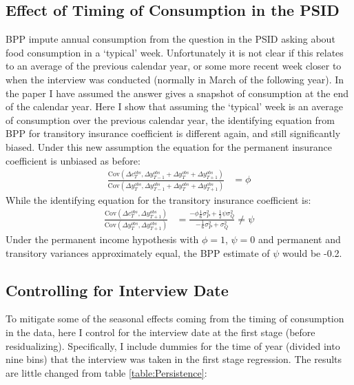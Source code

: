 \subsection{Effect of Timing of Consumption in the PSID} \label{typical_week}
BPP impute annual consumption from the question in the PSID asking about food consumption in a `typical' week. Unfortunately it is not clear if this relates to an average of the previous calendar year, or some more recent week closer to when the interview was conducted (normally in March of the following year). In the paper I have assumed the answer gives a snapshot of consumption at the end of the calendar year. Here I show that assuming the `typical' week is an average of consumption over the previous calendar year, the identifying equation from BPP for transitory insurance coefficient is different again, and still significantly biased. Under this new assumption the equation for the permanent insurance coefficient is unbiased as before:
\begin{align*}
\frac{\mathrm{Cov}(\Delta c^{obs}_{T}, \Delta y^{obs}_{T-1}+\Delta y^{obs}_{T}+\Delta y^{obs}_{T+1})}{\mathrm{Cov}(\Delta y^{obs}_{T}, \Delta y^{obs}_{T-1}+\Delta y^{obs}_{T}+\Delta y^{obs}_{T+1})}&= \phi
\end{align*}
While the identifying equation for the transitory insurance coefficient is:
\begin{align*}
\frac{\mathrm{Cov}(\Delta c^{obs}_{T},\Delta y^{obs}_{T+1})}{\mathrm{Cov}(\Delta y^{obs}_{T},\Delta y^{obs}_{T+1})} &= \frac{-\phi\frac{1}{6}\sigma^2_P + \frac{1}{2}\psi\sigma^2_Q}{-\frac{1}{6}\sigma^2_P + \sigma^2_Q} \neq \psi 
\end{align*}
Under the permanent income hypothesis with $\phi=1$, $\psi=0$ and permanent and transitory variances approximately equal, the BPP estimate of $\psi$ would be -0.2.

\subsection{Controlling for Interview Date} \label{interview_date}
To mitigate some of the seasonal effects coming from the timing of consumption in the data, here I control for the interview date at the first stage (before residualizing). Specifically, I include dummies for the time of year (divided into nine bins) that the interview was taken in the first stage regression. The results are little changed from table \ref{table:Persistence}:

